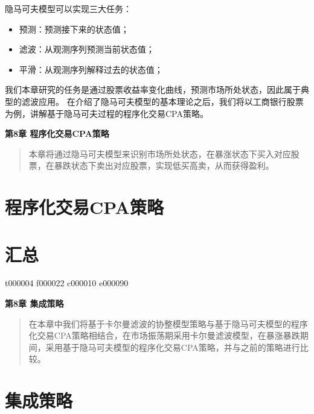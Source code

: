 \documentclass{article}
\begin{document}
隐马可夫模型可以实现三大任务：
\begin{itemize}
\item 预测：预测接下来的状态值；
\item 滤波：从观测序列预测当前状态值；
\item 平滑：从观测序列解释过去的状态值；
\end{itemize}
我们本章研究的任务是通过股票收益率变化曲线，预测市场所处状态，因此属于典型的滤波应用。\newline
在介绍了隐马可夫模型的基本理论之后，我们将以工商银行股票为例，讲解基于隐马可夫过程的程序化交易CPA策略。

\maketitle\begin{center}
\Large \textbf{第8章 程序化交易CPA策略}
\end{center}
\begin{abstract}
本章将通过隐马可夫模型来识别市场所处状态，在暴涨状态下买入对应股票，在暴跌状态下卖出对应股票，实现低买高卖，从而获得盈利。
\end{abstract}
\section{程序化交易CPA策略}



\section{汇总}
t000004
f000022
c000010
e000090



\maketitle\begin{center}
\Large \textbf{第8章 集成策略}
\end{center}
\begin{abstract}
在本章中我们将基于卡尔曼滤波的协整模型策略与基于隐马可夫模型的程序化交易CPA策略相结合，在市场振荡期采用卡尔曼滤波模型，在暴涨暴跌期间，采用基于隐马可夫模型的程序化交易CPA策略，并与之前的策略进行比较。
\end{abstract}
\section{集成策略}
\end{document}
